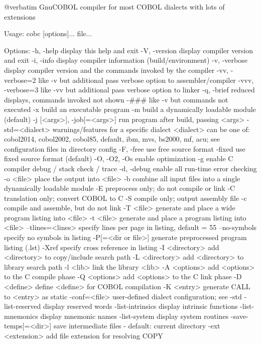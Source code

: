 @verbatim
GnuCOBOL compiler for most COBOL dialects with lots of extensions

Usage: cobc [options]... file...

Options:
  -h, -help             display this help and exit
  -V, -version          display compiler version and exit
  -i, -info             display compiler information (build/environment)
  -v, -verbose          display compiler version and the commands
                        invoked by the compiler
  -vv, -verbose=2       like -v but additional pass verbose option
                        to assembler/compiler
  -vvv, -verbose=3      like -vv but additional pass verbose option
                        to linker
  -q, -brief            reduced displays, commands invoked not shown
  -###                 like -v but commands not executed
  -x                    build an executable program
  -m                    build a dynamically loadable module (default)
  -j [<args>], -job[=<args>]	run program after build, passing <args>
  -std=<dialect>        warnings/features for a specific dialect
                        <dialect> can be one of:
                        cobol2014, cobol2002, cobol85, default,
                        ibm, mvs, bs2000, mf, acu;
                        see configuration files in directory config
  -F, -free             use free source format
  -fixed                use fixed source format (default)
  -O, -O2, -Os          enable optimization
  -g                    enable C compiler debug / stack check / trace
  -d, -debug            enable all run-time error checking
  -o <file>             place the output into <file>
  -b                    combine all input files into a single
                        dynamically loadable module
  -E                    preprocess only; do not compile or link
  -C                    translation only; convert COBOL to C
  -S                    compile only; output assembly file
  -c                    compile and assemble, but do not link
  -T <file>             generate and place a wide program listing into <file>
  -t <file>             generate and place a program listing into <file>
  --tlines=<lines>      specify lines per page in listing, default = 55
  --no-symbols          specify no symbols in listing
  -P[=<dir or file>]    generate preprocessed program listing (.lst)
  -Xref                 specify cross reference in listing
  -I <directory>        add <directory> to copy/include search path
  -L <directory>        add <directory> to library search path
  -l <lib>              link the library <lib>
  -A <options>          add <options> to the C compile phase
  -Q <options>          add <options> to the C link phase
  -D <define>           define <define> for COBOL compilation
  -K <entry>            generate CALL to <entry> as static
  -conf=<file>          user-defined dialect configuration; see -std
  -list-reserved        display reserved words
  -list-intrinsics      display intrinsic functions
  -list-mnemonics       display mnemonic names
  -list-system          display system routines
  -save-temps[=<dir>]   save intermediate files
                        - default: current directory
  -ext <extension>      add file extension for resolving COPY

